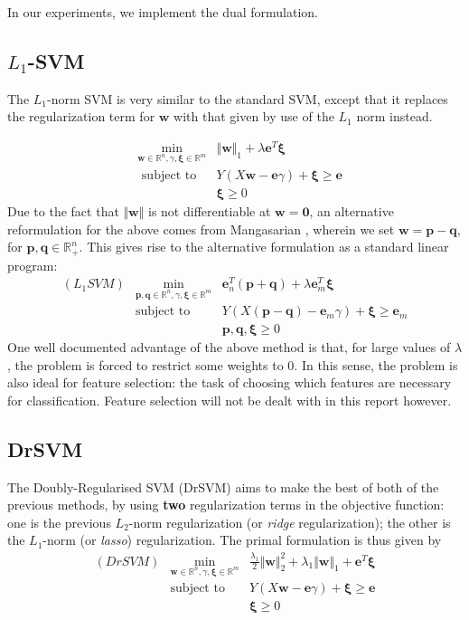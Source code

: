 \documentclass[11pt]{article}
\newcommand{\ds}{\displaystyle}
\begin{document}
In our experiments, we implement the dual formulation. 

\subsection{$L_1$-SVM \cite{l1norm}}

The $L_1$-norm SVM is very similar to the standard SVM, except that it replaces the regularization term for $\bm{w}$ with that given by use of the $L_1$ norm instead. 

\begin{eqnarray*}
& \ds \min_{\pmb{w}\in\mathbb{R}^n,\gamma,\pmb{\xi}\in\mathbb{R}^m} & \Vert \bm{w} \Vert_1  + \lambda\bm{e}^T\bm{\xi} 
\\
& \mbox{ subject to } & Y(X\bm{w} - \bm{e}\gamma) + \bm{\xi} \geq \bm{e} 
\\
& & \bm{\xi} \geq 0
\end{eqnarray*}
Due to the fact that $\Vert \bm{w} \Vert$ is not differentiable at $\bm{w} = \bm{0}$, an alternative reformulation for the above comes from Mangasarian \cite{pq}, wherein we set $\bm{w} = \bm{p} - \bm{q}$, for $\bm{p}, \bm{q} \in \mathbb{R}^n_+$. This gives rise to the alternative formulation as a standard linear program:
\begin{eqnarray*}
(L_1SVM) & \ds\min_{\bm{p},\bm{q}\in\mathbb{R}^n, \gamma, \bm{\xi}\in\mathbb{R}^m} & \bm{e}^T_n(\bm{p} + \bm{q}) + \lambda\bm{e}^T_m\bm{\xi}
\\
& \mbox{subject to } & Y(X(\bm{p} - \bm{q}) - \bm{e}_m\gamma) + \bm{\xi} \geq \bm{e}_m 
\\
& & \bm{p}, \bm{q}, \bm{\xi} \geq 0
\end{eqnarray*}
One well documented advantage of the above method is that, for large values of $\lambda$, the problem is forced to restrict some weights to 0. In this sense, the problem is also ideal for feature selection: the task of choosing which features are necessary for classification. Feature selection will not be dealt with in this report however. 

\subsection{DrSVM \cite{drsvm}}

The Doubly-Regularised SVM (DrSVM) aims to make the best of both of the previous methods, by using \textbf{two} regularization terms in the objective function: one is the previous $L_2$-norm regularization (or \emph{ridge} regularization); the other is the $L_1$-norm (or \emph{lasso}) regularization. The primal formulation is thus given by
\begin{eqnarray*}
(DrSVM) & \ds\min_{\pmb{w}\in\mathbb{R}^n, \gamma, \pmb{\xi}\in\mathbb{R}^m} & \ds\frac{\lambda_1}{2}\Vert \bm{w} \Vert_2^2 + \lambda_1 \Vert \bm{w} \Vert_1 + \bm{e}^T\bm{\xi}
\\
& \mbox{subject to } & Y(X\bm{w} - \bm{e}\gamma) + \bm{\xi} \geq \bm{e} 
\\
& & \bm{\xi} \geq 0
\end{eqnarray*}
\end{document}

